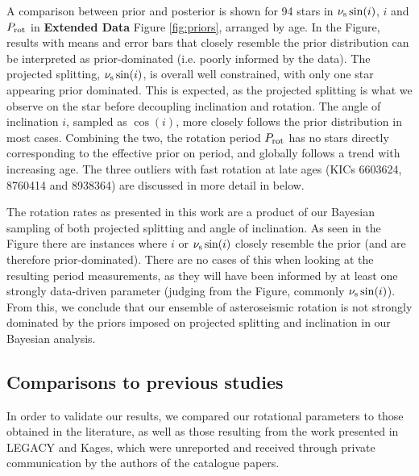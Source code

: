 A comparison between prior and posterior is shown for 94 stars in $\nu_{\rm s}\sin(i)$, $i$ and $P_{\rm rot}$ in \textbf{Extended Data} Figure \ref{fig:priors}, arranged by age. In the Figure, results with means and error bars that closely resemble the prior distribution can be interpreted as prior-dominated (i.e. poorly informed by the data). The projected splitting, $\nu_{\rm s}\sin(i)$, is overall well constrained, with only one star appearing prior dominated. This is expected, as the projected splitting is what we observe on the star before decoupling inclination and rotation. The angle of inclination $i$, sampled as $\cos(i)$, more closely follows the prior distribution in most cases. Combining the two, the rotation period $P_{\rm rot}$ has no stars directly corresponding to the effective prior on period, and globally follows a trend with increasing age. The three outliers with fast rotation at late ages (KICs 6603624, 8760414 and 8938364) are discussed in more detail in below.

The rotation rates as presented in this work are a product of our Bayesian sampling of both projected splitting and angle of inclination. As seen in the Figure there are instances where $i$ or $\nu_{\rm s}\sin(i)$ closely resemble the prior (and are therefore prior-dominated). There are no cases of this when looking at the resulting period measurements, as they will have been informed by at least one strongly data-driven parameter (judging from the Figure, commonly $\nu_{\rm s}\sin(i)$). From this, we conclude that our ensemble of asteroseismic rotation is not strongly dominated by the priors imposed on projected splitting and inclination in our Bayesian analysis.

\subsection{Comparisons to previous studies}\label{ssec:litcomp}
In order to validate our results, we compared our rotational parameters to those obtained in the literature, as well as those resulting from the work presented in LEGACY and Kages, which were unreported and received through private communication by the authors of the catalogue papers.

